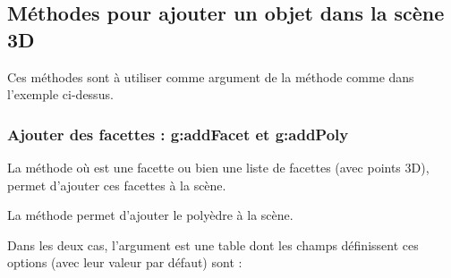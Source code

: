 \subsection{Méthodes pour ajouter un objet dans la scène 3D}

Ces méthodes sont à utiliser comme argument de la méthode  comme dans l'exemple ci-dessus.

\subsubsection{Ajouter des facettes : g:addFacet et g:addPoly}

La méthode  où  est une facette ou bien une liste de facettes (avec points 3D), permet d'ajouter ces facettes à la scène. 

La méthode  permet d'ajouter le polyèdre  à la scène. 

Dans les deux cas, l'argument  est une table dont les champs définissent ces options (avec leur valeur par défaut) sont :

